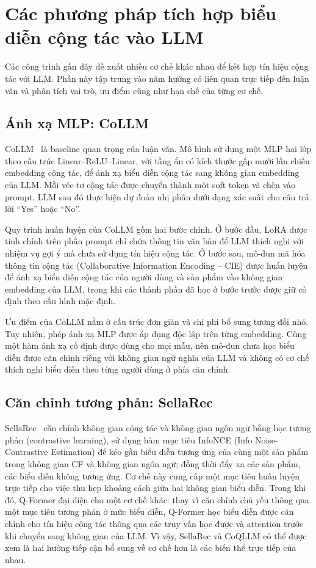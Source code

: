 \section{Các phương pháp tích hợp biểu diễn cộng tác vào LLM}
\label{sec:cach-noi-cf-llm}

Các công trình gần đây đề xuất nhiều cơ chế khác nhau để kết hợp tín hiệu cộng tác với LLM.
Phần này tập trung vào năm hướng có liên quan trực tiếp đến luận văn và phân tích vai trò, ưu
điểm cũng như hạn chế của từng cơ chế.

\subsection{Ánh xạ MLP: CoLLM}
\label{ssec:collm}

CoLLM~\cite{collm2023} là baseline quan trọng của luận văn. Mô hình sử dụng một MLP hai
lớp theo cấu trúc Linear--ReLU--Linear, với tầng ẩn có kích thước gấp mười lần chiều
embedding cộng tác, để ánh xạ biểu diễn cộng tác sang không gian embedding của LLM. Mỗi
véc-tơ cộng tác được chuyển thành một soft token và chèn vào prompt. LLM sau đó thực hiện
dự đoán nhị phân dưới dạng xác suất cho câu trả lời ``Yes'' hoặc ``No''.

Quy trình huấn luyện của CoLLM gồm hai bước chính. Ở bước đầu, LoRA được tinh chỉnh trên
phần prompt chỉ chứa thông tin văn bản để LLM thích nghi với nhiệm vụ gợi ý mà chưa sử
dụng tín hiệu cộng tác. Ở bước sau, mô-đun mã hóa thông tin cộng tác (Collaborative Information Encoding -- CIE) được huấn luyện để ánh xạ biểu diễn cộng tác
của người dùng và sản phẩm vào không gian embedding của LLM, trong khi các thành phần đã
học ở bước trước được giữ cố định theo cấu hình mặc định.

Ưu điểm của CoLLM nằm ở cấu trúc đơn giản và chi phí bổ sung tương đối nhỏ. Tuy nhiên,
phép ánh xạ MLP được áp dụng độc lập trên từng embedding. Cùng một hàm ánh xạ cố định được
dùng cho mọi mẫu, nên mô-đun chưa học biểu diễn được căn chỉnh riêng với không gian ngữ
nghĩa của LLM và không có cơ chế thích nghi biểu diễn theo từng người dùng ở phía căn chỉnh.

\subsection{Căn chỉnh tương phản: SellaRec}
\label{ssec:sellarec}

SellaRec~\cite{sellarec2024} căn chỉnh không gian cộng tác và không gian ngôn ngữ bằng học
tương phản (contrastive learning), sử dụng hàm mục tiêu InfoNCE (Info Noise-Contrastive Estimation) để kéo gần biểu diễn tương ứng
của cùng một sản phẩm trong không gian CF và không gian ngôn ngữ;
đồng thời đẩy xa các sản phẩm, các biểu diễn không tương ứng. Cơ chế này cung cấp một
mục tiêu huấn luyện trực tiếp cho việc thu hẹp khoảng cách giữa hai không gian biểu diễn. Trong khi đó,
Q-Former đại diện cho một cơ chế khác: thay vì căn chỉnh chủ yếu thông qua một mục tiêu
tương phản ở mức biểu diễn, Q-Former học biểu diễn được căn chỉnh cho tín hiệu cộng tác
thông qua các truy vấn học được và attention trước khi chuyển sang không gian của LLM. Vì vậy, SellaRec và CoQLLM có
thể được xem là hai hướng tiếp cận bổ sung về cơ chế hơn là các biến thể trực tiếp của nhau.

